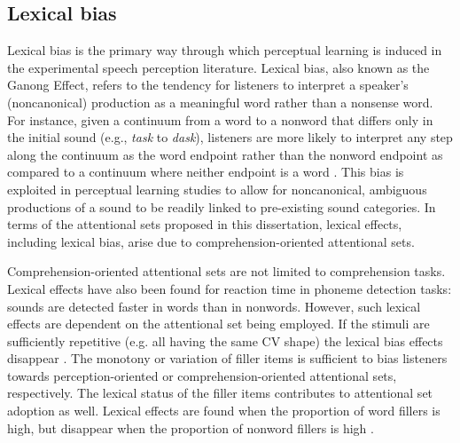 \subsection{Lexical bias}
\label{sec:lexicalbias}

Lexical bias is the primary way through which perceptual learning is induced in the experimental speech perception literature.
Lexical bias, also known as the Ganong Effect, refers to the tendency for listeners to interpret a speaker's (noncanonical) production as a meaningful word rather than a nonsense word.  
For instance, given a continuum from a word to a nonword that differs only in the initial sound (e.g., \emph{task} to \emph{dask}), listeners are more likely to interpret any step along the continuum as the word endpoint rather than the nonword endpoint as compared to a continuum where neither endpoint is a word \citep{Ganong1980}. 
This bias is exploited in perceptual learning studies to allow for noncanonical, ambiguous productions of a sound to be readily linked to pre-existing sound categories.
In terms of the attentional sets proposed in this dissertation, lexical effects, including lexical bias, arise due to comprehension-oriented attentional sets.

Comprehension-oriented attentional sets are not limited to comprehension tasks.
Lexical effects have also been found for reaction time in phoneme detection tasks:
sounds are detected faster in words than in nonwords.
However, such lexical effects are dependent on the attentional set being employed.  
If the stimuli are sufficiently repetitive (e.g. all having the same CV shape) the lexical bias effects disappear \citep{Cutler1987}.
The monotony or variation of filler items is sufficient to bias listeners towards perception-oriented or comprehension-oriented attentional sets, respectively.
The lexical status of the filler items contributes to attentional set adoption as well.
Lexical effects are found when the proportion of word fillers is high, but disappear when the proportion of nonword fillers is high \citep{Mirman2008}.

